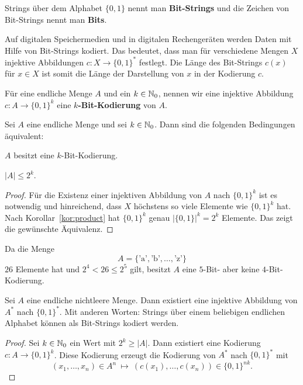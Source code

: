 \begin{defn} 
		Strings über dem Alphabet $\{0,1\}$ nennt man \textbf{Bit-Strings} und die Zeichen von Bit-Strings nennt man \textbf{Bits}.
\end{defn} 

\begin{bem}
	Auf digitalen Speichermedien und in digitalen Rechengeräten werden Daten mit Hilfe von Bit-Strings kodiert. Das bedeutet, dass man für verschiedene Mengen $X$ injektive Abbildungen $c : X \to \{0,1\}^\ast$ festlegt. Die Länge des Bit-Strings $c(x)$ für $x \in X$ ist somit die Länge der Darstellung von $x$ in der Kodierung $c$. 
\end{bem} 

\begin{defn}
	Für eine endliche Menge $A$ und ein $k \in \mathbb{N}_0$, nennen wir eine injektive Abbildung $c: A \to \{0,1\}^k$ eine \textbf{$k$-Bit-Kodierung} von $A$. 
\end{defn} 

\begin{prop}
Sei $A$ eine endliche Menge und sei $k \in \mathbb{N}_0$. Dann sind die folgenden Bedingungen äquivalent: 
\begin{enumi} 
	\item $A$ besitzt eine $k$-Bit-Kodierung.
	\item $ |A| \le 2^k$. 
\end{enumi} 
\end{prop} 
\begin{proof} 
	Für die Existenz einer injektiven Abbildung von $A$ nach $\{0,1\}^k$ ist es notwendig und hinreichend, dass $X$ höchstens so viele Elemente wie $\{0,1\}^k$ hat. Nach Korollar~\ref{kor:product} hat $\{0,1\}^k$ genau $|\{0,1\}|^k = 2^k$ Elemente. Das zeigt die gewünschte Äquivalenz. 
\end{proof} 

\begin{bsp}
	Da die Menge 
	\[
		A = \{\text{'a'},\text{'b'},\ldots,\text{'z'}\}
	\]
	$26$ Elemente hat und $2^4 < 26 \le 2^5$ gilt, besitzt $A$ eine $5$-Bit- aber keine $4$-Bit-Kodierung. 
\end{bsp} 

\begin{prop} \label{prop:beliebiges:alphabet->01}
	Sei $A$ eine endliche nichtleere Menge. Dann existiert eine injektive Abbildung von $A^\ast$ nach $\{0,1\}^\ast$. Mit anderen Worten: Strings über einem beliebigen endlichen Alphabet können als Bit-Strings kodiert werden. 
\end{prop} 
\begin{proof} 
	Sei $k \in \mathbb{N}_0$ ein Wert mit $2^k \ge |A|$. Dann existiert eine Kodierung $ c : A \to \{0,1\}^k$. Diese Kodierung erzeugt die Kodierung  von $A^\ast$ nach $\{0,1\}^\ast$ mit
	\[
		(x_1, \ldots ,x_n) \in A^n \ \mapsto \ (c(x_1),\ldots,c(x_n)) \in \{0,1\}^{nk}.
	\]
\end{proof} 


